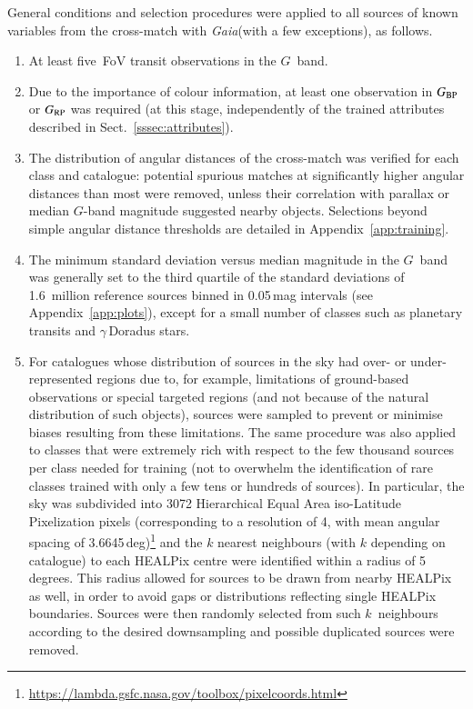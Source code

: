 \documentclass[longauth]{aa}
\def\gaia{\textit{Gaia}\xspace}
\def\g{$G$\xspace}
\def\bp{$G_{\rm BP}$\xspace}
\def\rp{$G_{\rm RP}$\xspace}
\begin{document}
General conditions and selection procedures were applied to all sources of known variables from the cross-match  with \gaia (with a few exceptions), as follows.
\begin{enumerate}
    \item At least five~FoV transit observations in the \g~band.
    \item Due to the importance of colour information, at least one observation in \bp or \rp was required (at this stage, independently of the trained attributes described in Sect.~\ref{sssec:attributes}).
    \item The distribution of angular distances of the cross-match was verified for each class and catalogue: potential spurious matches at significantly higher angular distances than most were removed, unless their correlation with parallax or median \g-band magnitude suggested nearby objects. Selections beyond simple angular distance thresholds are detailed in Appendix~\ref{app:training}.
    \item The minimum standard deviation versus median magnitude in the \g~band was generally set to the third quartile of the standard deviations of 1.6~million reference sources binned in 0.05\,mag intervals (see Appendix~\ref{app:plots}), except for a small number of classes such as planetary transits and $\gamma$\,Doradus stars.
    \item For catalogues whose distribution of sources in the sky had over- or under-represented regions due to, for example, limitations of ground-based observations or special targeted regions (and not because of the natural distribution of such objects), sources were sampled to prevent or minimise biases resulting from these limitations. 
    The same procedure was also applied to classes that were extremely rich with respect to the few thousand sources per class needed for training (not to overwhelm the identification of rare classes trained with only a few tens or hundreds of sources). In particular, the sky was subdivided into 3072 Hierarchical Equal Area iso-Latitude Pixelization \citep[HEALPix;][]{2002ASPC..281..107G} pixels (corresponding to a resolution of 4, with mean angular spacing of 3.6645\,deg)\footnote{\url{https://lambda.gsfc.nasa.gov/toolbox/pixelcoords.html}} and the $k$ nearest neighbours (with $k$ depending on catalogue) to each HEALPix centre were identified within a radius of 5\,degrees. 
    This radius allowed for sources to be drawn from nearby HEALPix as well, in order to avoid gaps or distributions reflecting single HEALPix boundaries. Sources were then randomly selected from such $k$~neighbours according to the desired downsampling and possible duplicated sources were removed.

\end{enumerate}
\end{document}
